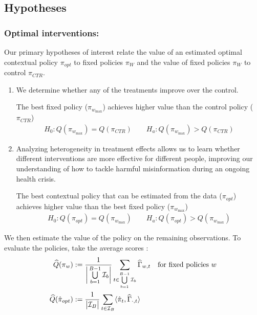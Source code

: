 \documentclass[letterpaper, 12pt, parskip=full,]{scrartcl}
\begin{document}
\subsection{Hypotheses}


\subsubsection{Optimal interventions:}

Our primary hypotheses of interest relate the value of an estimated optimal contextual policy $\pi_{opt}$ to fixed policies $\pi_{W}$ and the value of fixed policies $\pi_{W}$ to control $\pi_{CTR}$.


\begin{enumerate}
\item[ ] 
We determine whether any of the treatments improve over the control. 
\begin{hypothesis} The best fixed policy ($\pi_{w_{\textrm{max} } }$) achieves higher value than the control policy ($\pi_{CTR}$)   \label{eq:control_null}
\begin{align*}
H_{0}: Q(\pi_{w_{\textrm{max} } }) = Q(\pi_{CTR}) \qquad H_{a}:  Q(\pi_{w_{\textrm{max} } }) > Q(\pi_{CTR})
\end{align*}
\end{hypothesis}
  \item[ ]
  
  Analyzing heterogeneity in treatment effects allows us to learn whether different interventions are more effective for different people, improving our understanding of how to tackle harmful misinformation during an ongoing health crisis.
  \begin{hypothesis}
  The best contextual policy that can be estimated from the data ($\pi_{opt}$) achieves higher value than the best fixed policy ($\pi_{w_{\textrm{max} } }$)\label{eq:bestfix_null}
\begin{align*}
  H_{0}: Q(\pi_{opt}) = Q(\pi_{w_{\textrm{max}}}) \qquad H_{a}:  Q(\pi_{opt}) > Q(\pi_{w_{\textrm{max}}})
\end{align*}
\end{hypothesis}
\end{enumerate}



We then estimate the value of the policy on the remaining observations. To evaluate the policies, take the average scores :
    \begin{align*}
          \widehat{Q}({\pi}_{w})  &:= \frac{1}{\bigg{\lvert} \bigcup\limits_{b=1}^{B-1} \mathcal{I}_{b} \bigg{\rvert}} \sum_{t \in \bigcup\limits_{b=1}^{B-1} \mathcal{I}_{b} } \widehat{\Gamma}_{w,t} \quad \text{for fixed policies $w$}\\
                     \widehat{Q}(\hat{\pi}_{opt})  &:= \frac{1}{\big{\lvert}  \mathcal{I}_{B} \big{\rvert}} \sum_{t \in \mathcal{I}_{B} }
                      \langle \hat{\pi}_{t}, \widehat{\Gamma}_{\cdot, t}  \rangle 
    \end{align*}
\end{document}
